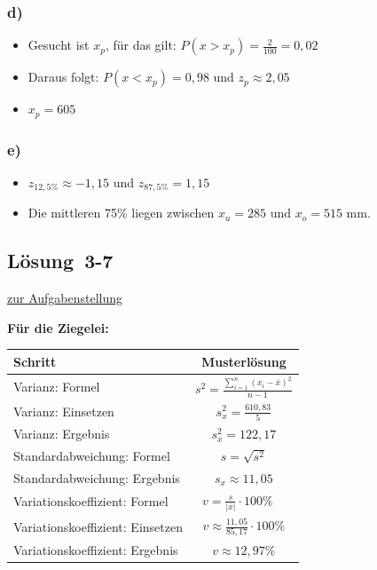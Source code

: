 \documentclass[
  11pt,
  ngerman,
  a4paper,
]{report}
\providecommand{\tightlist}{%
  \setlength{\itemsep}{0pt}\setlength{\parskip}{0pt}}
\begin{document}
\hypertarget{d-5}{%
\subsubsection{d)}\label{d-5}}

\begin{itemize}
\tightlist
\item
  Gesucht ist \(x_p\), für das gilt: \(P(x>x_p) = \frac{2}{100}=0,02\)
\item
  Daraus folgt: \(P(x<x_p) = 0,98\) und \(z_p\approx2,05\)
\item
  \(x_p = 605\)
\end{itemize}

\hypertarget{e-1}{%
\subsubsection{e)}\label{e-1}}

\begin{itemize}
\tightlist
\item
  \(z_{12,5\%}\approx -1,15\) und \(z_{87,5\%}= 1,15\)
\item
  Die mittleren 75\% liegen zwischen \(x_u=285\) und \(x_o=515\) mm.
\end{itemize}

\hypertarget{loesung-3-7}{%
\subsection{Lösung~3-7}\label{loesung-3-7}}

\protect\hyperlink{aufgabe-3-7}{zur Aufgabenstellung}

\textbf{Für die Ziegelei:}

\begin{table}[H]
\centering
\begin{tabular}{lc}
\toprule
Schritt & Musterlösung\\
\midrule
Varianz: Formel & $s^2=\frac{\sum\limits_{i=1}^{n}(x_{i}-\bar{x})^2}{n-1}$\\
Varianz: Einsetzen & $s^2_x=\frac{610{,}83}{5}$\\
Varianz: Ergebnis & $s^2_x=122{,}17$\\
Standardabweichung: Formel & $s=\sqrt{s^2}$\\
Standardabweichung: Ergebnis & $s_x\approx11{,}05$\\
Variationskoeffizient: Formel & $v=\frac{s}{|\bar{x}|}\cdot100\%\quad$\\
Variationskoeffizient: Einsetzen & $v\approx\frac{11{,}05}{85{,}17}\cdot100\%$\\
Variationskoeffizient: Ergebnis & $v \approx 12{,}97\%$\\
\bottomrule
\end{tabular}
\end{table}
\end{document}
